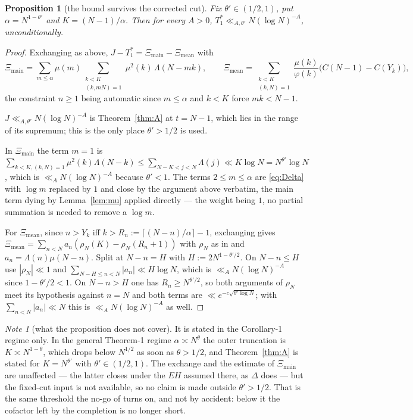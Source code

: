 \documentclass[11pt,a4paper]{article}
\theoremstyle{plain}
\newtheorem{proposition}[theorem]{Proposition}
\theoremstyle{definition}
\theoremstyle{remark}
\newtheorem{note}[theorem]{Note}
\begin{document}
\begin{proposition}[the bound survives the corrected cut]%
\label{prop:movingcut}
Fix $\theta'\in(1/2,1)$, put $\alpha=N^{1-\theta'}$ and
$K=(N-1)/\alpha$. Then for every $A>0$,
$T_1^\ast\ll_{A,\theta'}N(\log N)^{-A}$, unconditionally.
\end{proposition}

\begin{proof}
Exchanging as above,
$J-T_1^\ast=\Xi_{\mathrm{main}}-\Xi_{\mathrm{mean}}$ with
\[
  \Xi_{\mathrm{main}}=\sum_{m\le\alpha}\mu(m)\!\!
    \sum_{\substack{k<K\\ (k,mN)=1}}\!\!\mu^2(k)\,\Lambda(N-mk),
  \qquad
  \Xi_{\mathrm{mean}}=\!\!\sum_{\substack{k<K\\(k,N)=1}}\!\!
    \frac{\mu(k)}{\varphi(k)}\bigl(C(N-1)-C(Y_k)\bigr),
\]
the constraint $n\ge1$ being automatic since $m\le\alpha$ and $k<K$
force $mk<N-1$.

$J\ll_{A,\theta'}N(\log N)^{-A}$ is Theorem~\ref{thm:A} at $t=N-1$,
which lies in the range of its supremum; this is the only place
$\theta'>1/2$ is used.

In $\Xi_{\mathrm{main}}$ the term $m=1$ is
$\sum_{k<K,(k,N)=1}\mu^2(k)\Lambda(N-k)\le\sum_{N-K<j<N}\Lambda(j)\ll
K\log N=N^{\theta'}\log N$, which is $\ll_AN(\log N)^{-A}$ because
$\theta'<1$. The terms $2\le m\le\alpha$ are \eqref{eq:Delta} with
$\log m$ replaced by $1$ and close by the argument above verbatim, the
main term dying by Lemma~\ref{lem:mu} applied directly --- the weight
being $1$, no partial summation is needed to remove a $\log m$.

For $\Xi_{\mathrm{mean}}$, since $n>Y_k$ iff
$k>R_n:=\lceil(N-n)/\alpha\rceil-1$, exchanging gives
$\Xi_{\mathrm{mean}}=\sum_{n<N}a_n(\rho_N(K)-\rho_N(R_n+1))$ with
$\rho_N$ as in \cite[Lem.~14]{P2} and
$a_n=\Lambda(n)\mu(N-n)$. Split at $N-n=H$ with
$H:=2N^{1-\theta'/2}$. On $N-n\le H$ use $|\rho_N|\ll1$ and
$\sum_{N-H\le n<N}|a_n|\ll H\log N$, which is $\ll_AN(\log N)^{-A}$
since $1-\theta'/2<1$. On $N-n>H$ one has $R_n\ge N^{\theta'/2}$, so
both arguments of $\rho_N$ meet its hypothesis against $n=N$ and both
terms are $\ll e^{-c\sqrt{\theta'\log N}}$; with
$\sum_{n<N}|a_n|\ll N$ this is $\ll_AN(\log N)^{-A}$ as well.
\end{proof}

\begin{note}[what the proposition does not cover]
It is stated in the Corollary-1 regime only. In the general Theorem-1
regime $\alpha\asymp N^{\theta}$ the outer truncation is
$K\asymp N^{1-\theta}$, which drops below $N^{1/2}$ as soon as
$\theta>1/2$, and Theorem~\ref{thm:A} is stated for $K=N^{\theta'}$
with $\theta'\in(1/2,1)$. The exchange and the estimate of
$\Xi_{\mathrm{main}}$ are unaffected --- the latter closes under the
$EH$ assumed there, as $\Delta$ does --- but the fixed-cut input is not
available, so no claim is made outside $\theta'>1/2$. That is the same
threshold the no-go of \cite{P2} turns on, and not by accident: below
it the cofactor left by the completion is no longer short.
\end{note}
\end{document}
